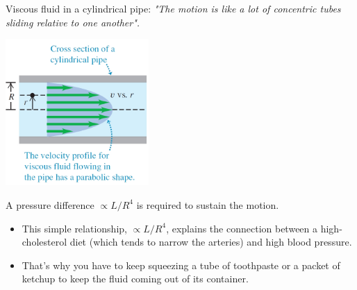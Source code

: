\documentclass[]{beamer}
\begin{document}
\begin{frame}

  \textcolor{mypink1}{Viscous fluid in a cylindrical pipe}:
  \pause \textit{"The motion is like a lot of concentric tubes sliding relative to one another".}
  
  
   \begin{center}
    \includegraphics[height=2.2in]{images2/viscosity2.jpg}
  \end{center}
  
  \pause
  A pressure difference $\propto L/R^4$ is required to sustain the motion.
  
   \end{frame}


   \begin{frame}
    \begin{itemize}
      \item    This simple relationship, $\propto L/R^4$,
      explains the connection between a high-cholesterol diet (which tends to narrow
      the arteries) and high blood pressure.
      \pause
      \item That’s  why you have to keep squeezing a tube of toothpaste or a packet of ketchup
       to keep the fluid coming out of its container.
    \end{itemize}


\end{frame}








\end{document}

